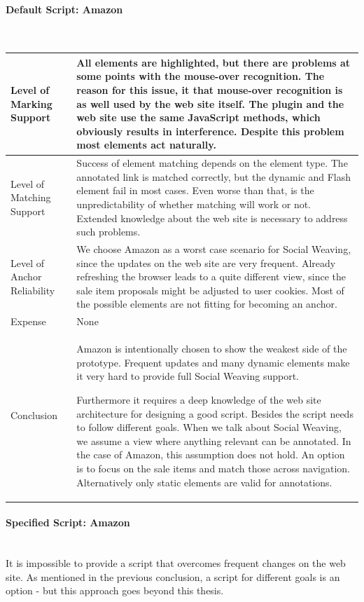 \paragraph{Default Script: Amazon}\mbox{}\\
\begin{tabular}{|p{}| p{} |}
\hline 
Level of Marking Support & All elements are highlighted, but there are problems at some points with the mouse-over recognition.  The reason for this issue, it that mouse-over recognition is as well used by the web site itself. The plugin and the web site use the same JavaScript methods, which obviously results in interference. Despite this problem most elements act naturally.\\ 
\hline 
Level of Matching Support & Success of element matching depends on the element type. The annotated link is matched correctly, but the dynamic and Flash element fail in most cases. Even worse than that, is the unpredictability of whether matching will work or not. Extended knowledge about the web site is necessary to address such problems. \\ 
\hline 
Level of Anchor Reliability & We choose Amazon as a worst case scenario for Social Weaving, since the updates on the web site are very frequent. Already refreshing the browser leads to a quite different view, since the sale item proposals might be adjusted to user cookies. Most of the possible elements are not fitting for becoming an anchor. \\ 
\hline 
Expense & None\\ 
\hline 
Conclusion & Amazon is intentionally chosen to show the weakest side of the prototype. Frequent updates and many dynamic elements make it very hard to provide full Social Weaving support. 

Furthermore it requires a deep knowledge of the web site architecture for designing a good script. Besides the script needs to follow different goals. When we talk about Social Weaving, we assume a view where anything relevant can be annotated. In the case of Amazon, this assumption does not hold. An option is to focus on the sale items and match those across navigation. Alternatively only static elements are valid for annotations. \\ 
\hline 
\end{tabular} 
\paragraph{Specified Script: Amazon}\mbox{}\\
It is impossible to provide a script that overcomes frequent changes on the web site. As mentioned in the previous conclusion, a script for different goals is an option - but this approach goes beyond this thesis. 

